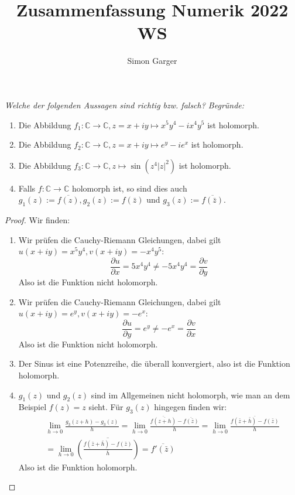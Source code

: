 \documentclass[11pt]{article}
\title{Zusammenfassung Numerik 2022 WS}
\author{Simon Garger}
\newenvironment{problem}[2][Beispiel]{
    \begin{trivlist}
        \item[\hskip \labelsep {\bfseries #1}\hskip \labelsep {\bfseries #2.}] \itshape}{
    \end{trivlist}\normalshape
}
\begin{document}
    \begin{problem}{1}
        Welche der folgenden Aussagen sind richtig bzw. falsch? Begründe:
        \begin{enumerate}[label = (\alph*)]
            \item Die Abbildung $f_1: \mathbb{C} \rightarrow \mathbb{C}, z=x+i y \mapsto x^5 y^4-i x^4 y^5$ ist
            holomorph.
            \item Die Abbildung $f_2: \mathbb{C} \rightarrow \mathbb{C}, z=x+i y \mapsto e^y-i e^x$
            ist holomorph.
            \item Die Abbildung $f_3: \mathbb{C} \rightarrow \mathbb{C}, z
            \mapsto \sin \left(z^4|z|^2\right)$ ist holomorph.
            \item Falls $f: \mathbb{C} \rightarrow \mathbb{C}$ holomorph ist, so sind dies auch
            $g_1(z):=\overline{f(z)}, g_2(z):=f(\bar{z})$ und $g_3(z):=\overline{f(\bar{z})}$.
        \end{enumerate}
    \end{problem}

    \begin{proof}
        Wir finden:
        \begin{enumerate}[label = (\alph*)]
            \item Wir prüfen die Cauchy-Riemann Gleichungen, dabei gilt $u(x+iy)=x^{5}y^4, v(x+iy) = -x^{4}y^5$:
            $$\frac{\partial u}{\partial x} = 5x^4y^4\neq -5x^4 y^4 = \frac{\partial v}{\partial y}$$
            Also ist die Funktion nicht holomorph.
            \item Wir prüfen die Cauchy-Riemann Gleichungen, dabei gilt $u(x+iy)=e^y, v(x+iy) = -e^x$:
            $$\frac{\partial u}{\partial y} = e^y\neq -e^x = \frac{\partial v}{\partial x}$$
            Also ist die Funktion nicht holomorph.
            \item Der Sinus ist eine Potenzreihe, die überall konvergiert, also ist die Funktion holomorph.
            \item $g_1(z)$ und $g_2(z)$ sind im Allgemeinen nicht holomorph, wie man an dem Beispiel $f(z) = z$ sieht.
            Für $g_3(z)$ hingegen finden wir:
            $$\begin{aligned}
                  &\lim_{h\to0} \frac{g_3(z+h)-g_3(z)}{h} = \lim_{h\to0}
                  \frac{\overline{f(\overline{z+h})}-\overline{f(\bar{z})}}{h} = \lim_{h\to0}
                  \frac{\overline{f(\bar{z}+\bar{h})-f(\bar{z})}}{h} \\&= \lim_{h\to0}
                  \overline{\left(\frac{f(\bar{z}+\bar{h})-f(\bar{z})}{\bar{h}}\right)} =
                  \overline{f'(\bar{z})}
            \end{aligned}$$
            Also ist die Funktion holomorph.
        \end{enumerate}
    \end{proof}
\end{document}
